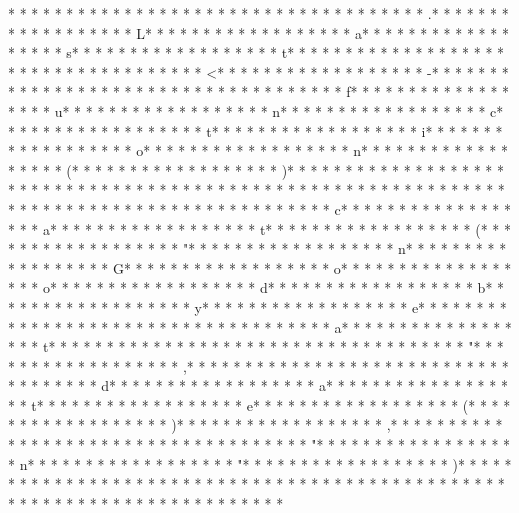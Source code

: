 * * *  * * *  * * *  *  * * *  *  * * *  *  * * *  * * *  * * *  *  * * *  *  * * *  * .* * *  * * *  * * *  *  * * *  *  * * *  * L* * *  * * *  * * *  *  * * *  *  * * *  * a* * *  * * *  * * *  *  * * *  *  * * *  * s* * *  * * *  * * *  *  * * *  *  * * *  * t* * *  * * *  * * *  *  * * *  *  * * *  *  * * *  * * *  * * *  *  * * *  *  * * *  * <* * *  * * *  * * *  *  * * *  *  * * *  * -* * *  * * *  * * *  *  * * *  *  * * *  *  * * *  * * *  * * *  *  * * *  *  * * *  * f* * *  * * *  * * *  *  * * *  *  * * *  * u* * *  * * *  * * *  *  * * *  *  * * *  * n* * *  * * *  * * *  *  * * *  *  * * *  * c* * *  * * *  * * *  *  * * *  *  * * *  * t* * *  * * *  * * *  *  * * *  *  * * *  * i* * *  * * *  * * *  *  * * *  *  * * *  * o* * *  * * *  * * *  *  * * *  *  * * *  * n* * *  * * *  * * *  *  * * *  *  * * *  * (* * *  * * *  * * *  *  * * *  *  * * *  * )* * *  * * *  * * *  *  * * *  *  * * *  * {* * *  * * *  * * *  *  * * *  *  * * *  *  * * *  * * *  * * *  *  * * *  *  * * *  * 
* * *  * * *  * * *  *  * * *  *  * * *  *  * * *  * * *  * * *  *  * * *  *  * * *  * c* * *  * * *  * * *  *  * * *  *  * * *  * a* * *  * * *  * * *  *  * * *  *  * * *  * t* * *  * * *  * * *  *  * * *  *  * * *  * (* * *  * * *  * * *  *  * * *  *  * * *  * "* * *  * * *  * * *  *  * * *  *  * * *  * n* * *  * * *  * * *  *  * * *  *  * * *  * G* * *  * * *  * * *  *  * * *  *  * * *  * o* * *  * * *  * * *  *  * * *  *  * * *  * o* * *  * * *  * * *  *  * * *  *  * * *  * d* * *  * * *  * * *  *  * * *  *  * * *  * b* * *  * * *  * * *  *  * * *  *  * * *  * y* * *  * * *  * * *  *  * * *  *  * * *  * e* * *  * * *  * * *  *  * * *  *  * * *  *  * * *  * * *  * * *  *  * * *  *  * * *  * a* * *  * * *  * * *  *  * * *  *  * * *  * t* * *  * * *  * * *  *  * * *  *  * * *  *  * * *  * * *  * * *  *  * * *  *  * * *  * "* * *  * * *  * * *  *  * * *  *  * * *  * ,* * *  * * *  * * *  *  * * *  *  * * *  *  * * *  * * *  * * *  *  * * *  *  * * *  * d* * *  * * *  * * *  *  * * *  *  * * *  * a* * *  * * *  * * *  *  * * *  *  * * *  * t* * *  * * *  * * *  *  * * *  *  * * *  * e* * *  * * *  * * *  *  * * *  *  * * *  * (* * *  * * *  * * *  *  * * *  *  * * *  * )* * *  * * *  * * *  *  * * *  *  * * *  * ,* * *  * * *  * * *  *  * * *  *  * * *  *  * * *  * * *  * * *  *  * * *  *  * * *  * "* * *  * * *  * * *  *  * * *  *  * * *  * n* * *  * * *  * * *  *  * * *  *  * * *  * "* * *  * * *  * * *  *  * * *  *  * * *  * )* * *  * * *  * * *  *  * * *  *  * * *  * 
* * *  * * *  * * *  *  * * *  *  * * *  *  * * *  * * *  * * *  *  * * *  *  * * *  * }* * *  * * *  * * *  *  * * *  *  * * *  * 
